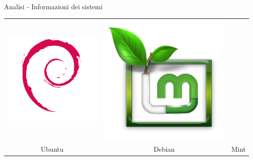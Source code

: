 \documentclass[12pt]{beamer}
\begin{document}
\begin{frame}[fragile]{Analisi - Informazioni dei sistemi}
\begin{center}
\begin{tabular}{ c c c }
    		\includegraphics[scale=0.2]{res/Debian} & 
    		\includegraphics[scale=0.15]{res/Mint} \\
    		Ubuntu & Debian & Mint\\
    	\end{tabular}
    \end{center}
  \end{frame}
  \begingroup
  \setlength{\tabcolsep}{4pt}
  \renewcommand{\arraystretch}{1.5}
\end{document}
